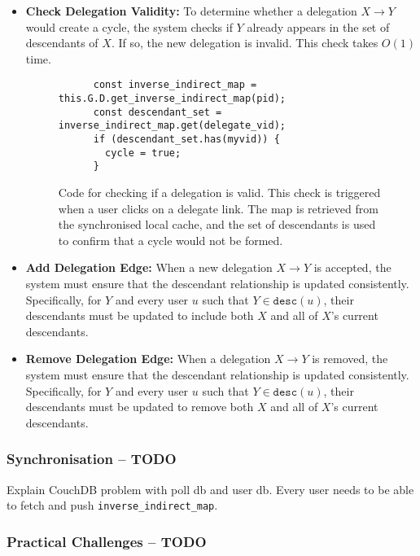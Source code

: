 \begin{itemize}
  \item \textbf{Check Delegation Validity:} To determine whether a delegation \(X \!\to\! Y\) would create a cycle, the system checks if \(Y\) already appears in the set of descendants of \(X\). If so, the new delegation is invalid. This check takes \(O(1)\) time.
  \begin{figure}[H]
    \centering
    \begin{verbatim}
      const inverse_indirect_map = this.G.D.get_inverse_indirect_map(pid);
      const descendant_set = inverse_indirect_map.get(delegate_vid);
      if (descendant_set.has(myvid)) {
        cycle = true;
      }
    \end{verbatim}
    \caption{Code for checking if a delegation is valid. This check is triggered when a user clicks on a delegate link. The map is retrieved from the synchronised local cache, and the set of descendants is used to confirm that a cycle would not be formed.}
  \end{figure}

  \item \textbf{Add Delegation Edge:} When a new delegation \(X \to Y\) is accepted, the system must ensure that the descendant relationship is updated consistently. Specifically, for $Y$ and every user \(u\) such that \(Y \in \texttt{desc}(u)\), their descendants must be updated to include both \(X\) and all of \(X\)'s current descendants.

  \item \textbf{Remove Delegation Edge:} When a delegation \(X \!\to\! Y\) is removed, the system must ensure that the descendant relationship is updated consistently. Specifically, for $Y$ and every user \(u\) such that \(Y \in \texttt{desc}(u)\), their descendants must be updated to remove both \(X\) and all of \(X\)'s current descendants.
\end{itemize}

\subsubsection{Synchronisation -- TODO}
Explain CouchDB problem with poll db and user db. Every user needs to be able to fetch and push \verb|inverse_indirect_map|.

\subsubsection{Practical Challenges -- TODO}

